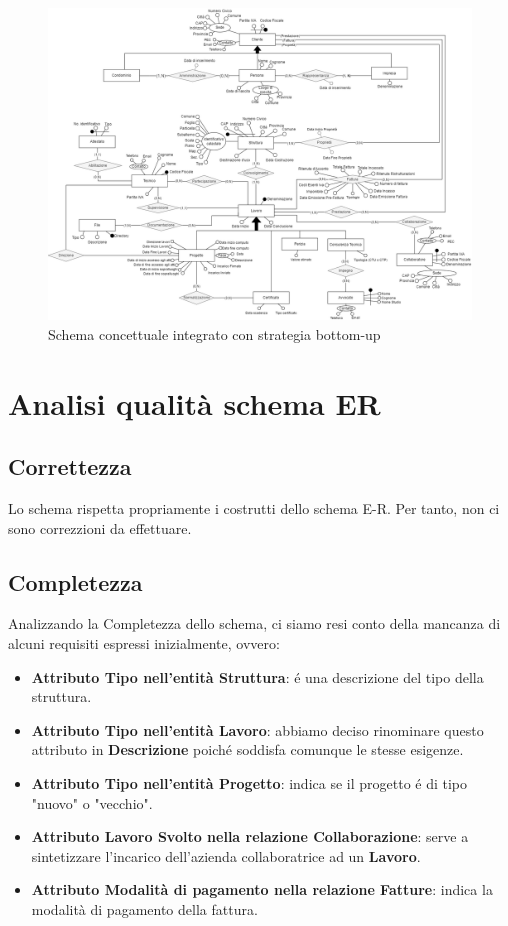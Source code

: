\documentclass{elegantbook}
\begin{document}
        \begin{figure}
            \centering
            \includegraphics[scale=0.5]{../Img/DBSchemes/schema-concettuale.png}
            \caption{Schema concettuale integrato con strategia bottom-up}
        \end{figure}
        \newpage
	\section{Analisi qualità schema ER}
        \subsection{Correttezza}
        Lo schema rispetta propriamente i costrutti dello schema E-R. Per tanto, non ci sono correzzioni da effettuare. 
        \subsection{Completezza}
        Analizzando la Completezza dello schema, ci siamo resi conto della mancanza di alcuni requisiti espressi inizialmente, ovvero:
        \begin{itemize}
            \item \textbf{Attributo Tipo nell'entità Struttura}: é una descrizione del tipo della struttura. 
            \item \textbf{Attributo Tipo nell'entità Lavoro}: abbiamo deciso rinominare questo attributo in \textbf{Descrizione} poiché soddisfa comunque le stesse esigenze.
            \item \textbf{Attributo Tipo nell'entità Progetto}: indica se il progetto é di tipo "nuovo" o "vecchio".
            \item \textbf{Attributo Lavoro Svolto nella relazione Collaborazione}: serve a sintetizzare l'incarico dell'azienda collaboratrice ad un \textbf{Lavoro}.
            \item \textbf{Attributo Modalità di pagamento nella relazione Fatture}: indica la modalità di pagamento della fattura.
        \end{itemize}
\end{document}
